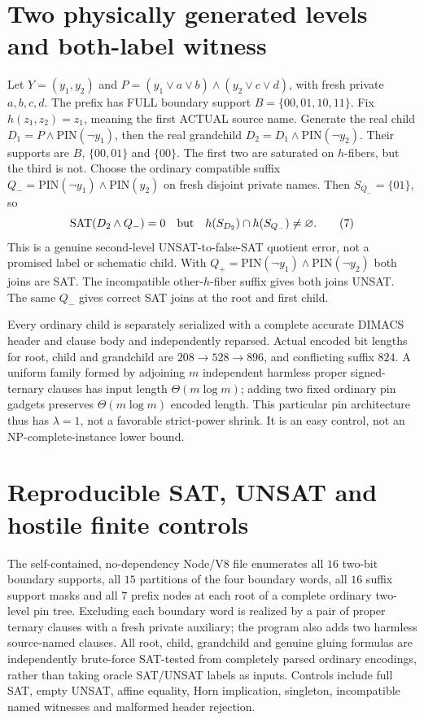 \documentclass[11pt]{article}
\newcommand{\SAT}{\operatorname{SAT}}
\begin{document}
\section{Two physically generated levels and both-label witness}
Let $Y=(y_1,y_2)$ and
$P=(y_1\vee a\vee b)\land(y_2\vee c\vee d)$,
with fresh private $a,b,c,d$. The prefix has FULL
boundary support $B=\{00,01,10,11\}$.
Fix $h(z_1,z_2)=z_1$, meaning the first
ACTUAL source name. Generate the real child
$D_1=P\land\mathrm{PIN}(\neg y_1)$,
then the real grandchild
$D_2=D_1\land\mathrm{PIN}(\neg y_2)$.
Their supports are $B$, $\{00,01\}$ and $\{00\}$.
The first two are saturated on $h$-fibers, but
the third is not. Choose the ordinary compatible
suffix $Q_-=\mathrm{PIN}(\neg y_1)\land
\mathrm{PIN}(y_2)$ on fresh disjoint private names.
Then $S_{Q_-}=\{01\}$, so
\[
 \SAT(D_2\land Q_-)=0\quad\hbox{but}\quad
 h(S_{D_2})\cap h(S_{Q_-})\ne\varnothing.               \tag{7}
\]
This is a genuine second-level UNSAT-to-false-SAT
quotient error, not a promised label or schematic child.
With $Q_+=\mathrm{PIN}(\neg y_1)\land
\mathrm{PIN}(\neg y_2)$ both joins are SAT.
The incompatible other-$h$-fiber suffix gives
both joins UNSAT. The same $Q_-$ gives
correct SAT joins at the root and first child.

Every ordinary child is separately serialized with
a complete accurate DIMACS header and clause body
and independently reparsed. Actual encoded bit
lengths for root, child and grandchild are
$208\to528\to896$, and conflicting suffix $824$.
A uniform family formed by adjoining $m$
independent harmless proper signed-ternary clauses
has input length $\Theta(m\log m)$; adding two
fixed ordinary pin gadgets preserves
$\Theta(m\log m)$ encoded length. This particular
pin architecture thus has $\lambda=1$, not
a favorable strict-power shrink. It is an
easy control, not an NP-complete-instance
lower bound.

\section{Reproducible SAT, UNSAT and hostile finite controls}
The self-contained, no-dependency Node/V8 file
enumerates all $16$ two-bit boundary supports,
all $15$ partitions of the four boundary words,
all $16$ suffix support masks and all $7$
prefix nodes at each root of a complete ordinary
two-level pin tree. Excluding each boundary
word is realized by a pair of proper ternary
clauses with a fresh private auxiliary; the
program also adds two harmless source-named
clauses. All root, child, grandchild and
genuine gluing formulas are independently
brute-force SAT-tested from completely parsed
ordinary encodings, rather than taking oracle
SAT/UNSAT labels as inputs. Controls include
full SAT, empty UNSAT, affine equality,
Horn implication, singleton, incompatible
named witnesses and malformed header rejection.
\end{document}
